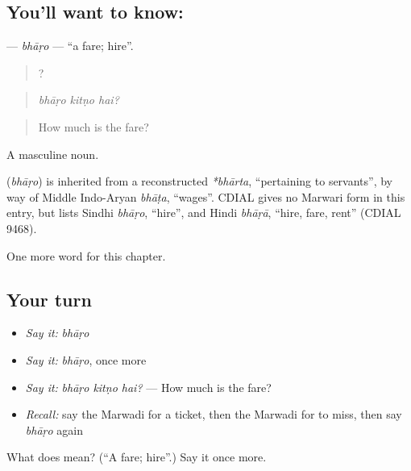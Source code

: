 \subsection*{You'll want to know: }
\textbf{} — \emph{bhāṛo} — \textquotedblleft{}a fare; hire\textquotedblright{}.

\begin{quote}
  ?
\end{quote}

\begin{quote}
\emph{bhāṛo kitṇo hai?}
\end{quote}

\begin{quote}
How much is the fare?
\end{quote}

A masculine noun.

\begin{cousinweb}
\textbf{} (\emph{bhāṛo}) is inherited from a reconstructed \emph{*bhārta}, \textquotedblleft{}pertaining to servants\textquotedblright{}, by way of Middle Indo-Aryan \emph{bhāṭa}, \textquotedblleft{}wages\textquotedblright{}. CDIAL gives no Marwari form in this entry, but lists Sindhi \emph{bhāṛo}, \textquotedblleft{}hire\textquotedblright{}, and Hindi \emph{bhāṛā}, \textquotedblleft{}hire, fare, rent\textquotedblright{} (CDIAL 9468).
\end{cousinweb}

\begin{grammarlens}[title={What you've built}]
One more word for this chapter.
\end{grammarlens}

\subsection*{Your turn}
\begin{itemize}
\raggedright
  \item \emph{Say it:} \emph{bhāṛo}
  \item \emph{Say it:} \emph{bhāṛo}, once more
  \item \emph{Say it:} \emph{bhāṛo kitṇo hai?} — How much is the fare?
  \item \emph{Recall:} say the Marwadi for a ticket, then the Marwadi for to miss, then say \emph{bhāṛo} again
\end{itemize}

\begin{tcolorbox}[breakable,colback=teal!4,colframe=teal!35!black,title={Before you move on}]
What does  mean? (\textquotedblleft{}A fare; hire\textquotedblright{}.) Say it once more.
\end{tcolorbox}
